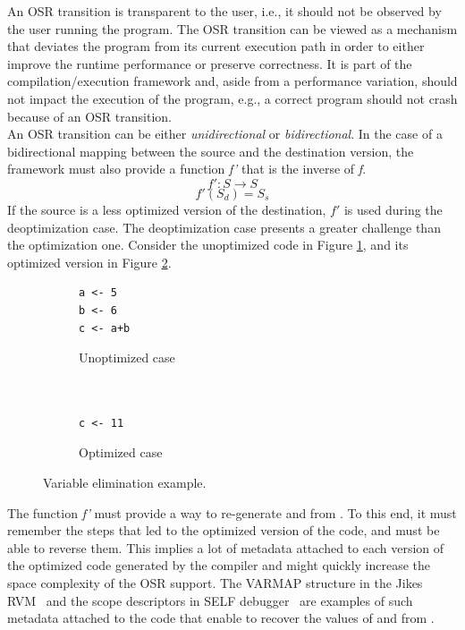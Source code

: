 An OSR transition is transparent to the user, i.e., it should not be observed by the user running the program.
The OSR transition can be viewed as a mechanism that deviates the program from its current execution path in order to either improve the runtime performance or preserve correctness.
It is part of the compilation/execution framework and, aside from a performance variation, should not impact the execution of the program, e.g., a correct program should not crash because of an OSR transition.\\

An OSR transition can be either \textit{unidirectional} or \textit{bidirectional}.
In the case of a bidirectional mapping between the source and the destination version, the framework must also provide a function \textit{f'} that is the inverse of \textit{f}.  
\[f': S \rightarrow S\]
\[f'(S_d) = S_s\]
If the source is a less optimized version of the destination, $f'$ is used during the deoptimization case.
The deoptimization case presents a greater challenge than the optimization one.
Consider the unoptimized code in Figure \ref{unoptimizedcase}, and its optimized version in Figure \ref{optimizedcase}.\\

\begin{figure}[h]
\centering
\begin{subfigure}{.49\textwidth}
  \centering
  \begin{lstlisting}
a <- 5
b <- 6
c <- a+b
    \end{lstlisting}
  \caption{Unoptimized case}
  \label{unoptimizedcase}
\end{subfigure}%
\begin{subfigure}{.49\textwidth}
  \centering
  \begin{lstlisting}
  
  
c <- 11
    \end{lstlisting}
  \caption{Optimized case}
  \label{optimizedcase}
\end{subfigure}
\caption{Variable elimination example.}
\label{variableEliminationExample}
\end{figure}

The function \textit{f'} must provide a way to re-generate  and  from . 
To this end, it must remember the steps that led to the optimized version of the code, and must be able to reverse them.
This implies a lot of metadata attached to each version of the optimized code generated by the compiler and might quickly increase the space complexity of the OSR support.
The VARMAP structure in the Jikes RVM~\cite{soman2006efficient} and the scope descriptors in SELF debugger~\cite{holzle1992debugging} are examples of such metadata attached to the code that enable to recover the values of  and  from .\\
 
